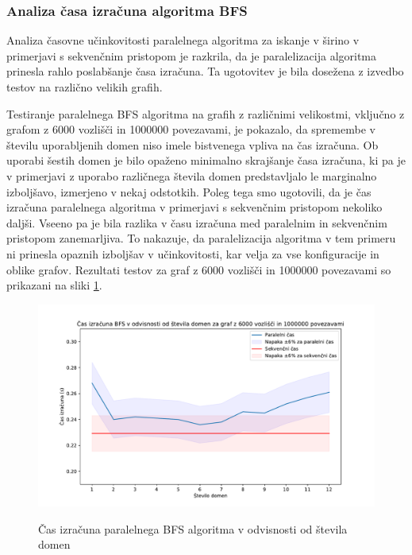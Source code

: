 \documentclass[mat1, tisk]{fmfdelo}
\begin{document}
\subsubsection{Analiza časa izračuna algoritma BFS}

Analiza časovne učinkovitosti paralelnega algoritma za iskanje v širino v primerjavi s sekvenčnim pristopom je
razkrila, da je paralelizacija algoritma prinesla rahlo poslabšanje časa izračuna.
Ta ugotovitev je bila dosežena z izvedbo testov na različno velikih grafih.

Testiranje paralelnega BFS algoritma na grafih z različnimi velikostmi, vključno z grafom z 6000 vozlišči in 1000000 povezavami,
je pokazalo, da spremembe v številu uporabljenih domen niso imele bistvenega vpliva na čas izračuna.
Ob uporabi šestih domen je bilo opaženo minimalno skrajšanje časa izračuna, ki pa je v primerjavi z uporabo različnega števila domen predstavljalo
le marginalno izboljšavo, izmerjeno v nekaj odstotkih. Poleg tega smo ugotovili, da je čas izračuna paralelnega algoritma v primerjavi s sekvenčnim
pristopom nekoliko daljši. Vseeno pa je bila razlika v času izračuna med paralelnim in sekvenčnim pristopom zanemarljiva.
To nakazuje, da paralelizacija algoritma v tem primeru ni prinesla opaznih izboljšav v učinkovitosti, kar velja za vse konfiguracije in oblike grafov.
Rezultati testov za graf z 6000 vozlišči in 1000000 povezavami so prikazani na sliki \ref{fig:bfs_calculation_time_by_num_domains}.

\begin{figure}[h!]
  \centering
  \caption{Čas izračuna paralelnega BFS algoritma v odvisnosti od števila domen}
  \includegraphics[width=15cm]{slike/bfs_v_odvisnosti_od_stevila_domen.pdf}
  \label{fig:bfs_calculation_time_by_num_domains}
\end{figure}
\end{document}
